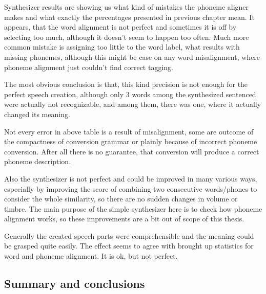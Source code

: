 \documentclass[12pt,a4paper,english]{article}
\begin{document}
Synthesizer results are showing us what kind of mistakes the phoneme aligner makes and what exactly the percentages presented in previous chapter mean. \newline
It appears, that the word alignment is not perfect and sometimes it is off by selecting too much, although it doesn't seem to happen too often. Much more common mistake is assigning too little to the word label, what results with missing phonemes, although this might be case on any word misalignment, where phoneme alignment just couldn't find correct tagging. \newline

The most obvious conclusion is that, this kind precision is not enough for the perfect speech creation, although only 3 words among the synthesized sentenced were actually not recognizable, and among them, there was one, where it actually changed its meaning. \newline

Not every error in above table is a result of misalignment, some are outcome of the compactness of conversion grammar or plainly because of incorrect phoneme conversion. After all there is no guarantee, that conversion will produce a correct phoneme description. \newline

Also the synthesizer is not perfect and could be improved in many various ways, especially by improving the score of combining two consecutive words/phones to consider the whole similarity, so there are no sudden changes in volume or timbre. The main purpose of the simple synthesizer here is to check how phoneme alignment works, so these improvements are a bit out of scope of this thesis. \newline

Generally the created speech parts were comprehensible and the meaning could be grasped quite easily. The effect seems to agree with brought up statistics for word and phoneme alignment. It is ok, but not perfect.


\newpage
\begin{center}
    \section{Summary and conclusions}
\end {center}
\setcounter{equation}{0}
\end{document}
